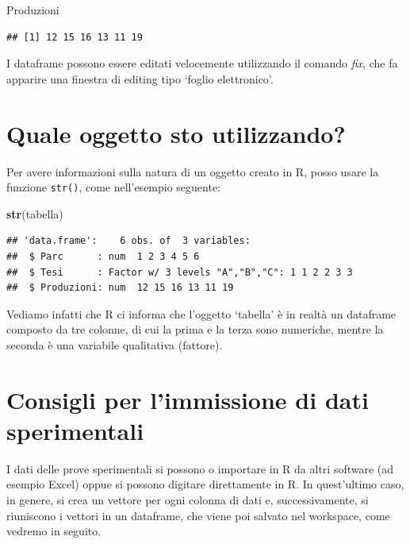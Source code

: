 \documentclass[a4paper,12pt,oneside]{book}
\newenvironment{Shaded}{\begin{snugshade}}{\end{snugshade}}
\newcommand{\KeywordTok}[1]{\textcolor[rgb]{0.13,0.29,0.53}{\textbf{#1}}}
\newcommand{\NormalTok}[1]{#1}
\begin{document}
\begin{Shaded}
\begin{Highlighting}[]
\NormalTok{Produzioni}
\end{Highlighting}
\end{Shaded}

\begin{verbatim}
## [1] 12 15 16 13 11 19
\end{verbatim}

I dataframe possono essere editati velocemente utilizzando il comando
\emph{fix}, che fa apparire una finestra di editing tipo `foglio
elettronico'.

\section{Quale oggetto sto
utilizzando?}\label{quale-oggetto-sto-utilizzando}

Per avere informazioni sulla natura di un oggetto creato in R, posso
usare la funzione \texttt{str()}, come nell'esempio seguente:

\begin{Shaded}
\begin{Highlighting}[]
\KeywordTok{str}\NormalTok{(tabella)}
\end{Highlighting}
\end{Shaded}

\begin{verbatim}
## 'data.frame':    6 obs. of  3 variables:
##  $ Parc      : num  1 2 3 4 5 6
##  $ Tesi      : Factor w/ 3 levels "A","B","C": 1 1 2 2 3 3
##  $ Produzioni: num  12 15 16 13 11 19
\end{verbatim}

Vediamo infatti che R ci informa che l'oggetto `tabella' è in realtà un
dataframe composto da tre colonne, di cui la prima e la terza sono
numeriche, mentre la seconda è una variabile qualitativa (fattore).

\section{Consigli per l'immissione di dati
sperimentali}\label{consigli-per-limmissione-di-dati-sperimentali}

I dati delle prove sperimentali si possono o importare in R da altri
software (ad esempio Excel) oppue si possono digitare direttamente in R.
In quest'ultimo caso, in genere, si crea un vettore per ogni colonna di
dati e, successivamente, si riuniscono i vettori in un dataframe, che
viene poi salvato nel workspace, come vedremo in seguito.
\end{document}
